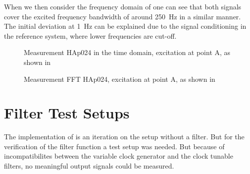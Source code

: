 When we then consider the frequency domain of  one can see that both signals cover the excited frequency bandwidth of around \SI{250}{\hertz} in a similar manner. The initial deviation at \SI{1}{\hertz} can be explained due to the signal conditioning in the reference system, where lower frequencies are cut-off.

\begin{figure}[!htb]
  \centering
  
  \caption[Andromeda Measurement HAp024, Time Domain in Z-Axis]{Measurement HAp024 in the time domain, excitation at point A, as shown in %
    \label{fig:HAp024_TDat_z}}
\end{figure}
\begin{figure}[!htb]
  \centering
  
  \caption[Andromeda Measurement HAp024, FFT in Z-Axis]{Measurement FFT HAp024, excitation at point A, as shown in %
    \label{fig:HAp024_FFTa_z}}
\end{figure}

\section{Filter Test Setups}
The implementation of  is an iteration on the setup without a filter. But for the verification of the filter function a test setup was needed. But because of incompatibilites between the variable clock generator and the clock tunable filters, no meaningful output signals could be measured.
